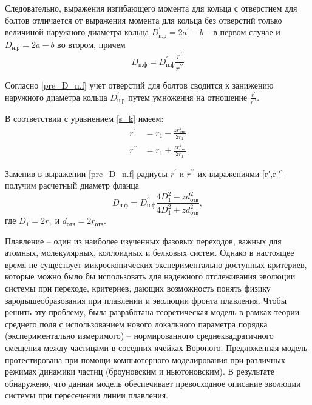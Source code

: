 Следовательно, выражения изгибающего момента для кольца с отверстием для болтов отличается от выражения момента для кольца без отверстий только величиной наружного диаметра кольца $D_{\text{н.р}}^{\prime} = 2a^{\prime}-b$ -- в первом случае и $D_{\text{н.р}} = 2a-b$ во втором, причем
\begin{equation}
  \label{pre_D_n.f}
  D_{\text{н.ф}} = D_{\text{н.ф}}^{\prime} \frac{r^{\prime}}{r^{\prime \prime}} 
\end{equation}

Согласно \eqref{pre_D_n.f} учет отверстий для болтов сводится к занижению наружного диаметра кольца $D_{\text{н.р}}^{\prime}$ путем умножения на отношение $\frac{r^{\prime}}{r^{\prime \prime}}$.

В соответствии с уравнением \eqref{s_k} имеем:
\begin{equation}
  \label{r',r''}
    \begin{split}
        r^{\prime} & = r_{1} - \frac{z r_{\text{отв}}^{2}}{2r_{1}} \\
        r^{\prime \prime} & = r_{1} + \frac{z r_{\text{отв}}^{2}}{2r_{1}}
    \end{split}
\end{equation}

Заменив в выражении \eqref{pre_D_n.f} радиусы $r^{\prime}$ и $r^{\prime \prime}$ их выражениями \eqref{r',r''} получим расчетный диаметр фланца
\begin{equation}
  \label{D_n.f}
  D_{\text{н.ф}} = D_{\text{н.ф}}^{\prime} \frac{4D_{1}^{2} - z d_{\text{отв}}^{2}}{4D_{1}^{2} + z d_{\text{отв}}^{2}},
\end{equation}
где $D_{1}=2r_{1}$ и $d_{\text{отв}}=2r_{\text{отв}}$.


Плавление -- один из наиболее изученных фазовых переходов, важных для атомных, молекулярных, коллоидных и белковых систем.
Однако в настоящее время не существует микроскопических экспериментально доступных критериев, которые можно было бы использовать для надежного отслеживания эволюции системы при переходе, критериев, дающих возможность понять физику зародышеобразования при плавлении и эволюции фронта плавления.
Чтобы решить эту проблему, была разработана теоретическая модель в рамках теории среднего поля с использованием нового локального параметра порядка (экспериментально измеримого) -- нормированного среднеквадратичного смещения между частицами в соседних ячейках Вороного.
Предложенная модель протестирована при помощи компьютерного моделирования при различных режимах динамики частиц (броуновским и ньютоновским).
В результате обнаружено, что данная модель обеспечивает превосходное описание эволюции системы при пересечении линии плавления.

